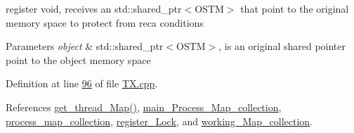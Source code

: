 register void, receives an std\+::shared\+\_\+ptr$<$\+O\+S\+T\+M$>$ that point to the original memory space to protect from reca conditions 


\begin{DoxyParams}{Parameters}
{\em object} & std\+::shared\+\_\+ptr$<$\+O\+S\+T\+M$>$, is an original shared pointer point to the object memory space \\
\hline
\end{DoxyParams}


Definition at line \hyperlink{_t_x_8cpp_source_l00096}{96} of file \hyperlink{_t_x_8cpp_source}{T\+X.\+cpp}.



References \hyperlink{_t_x_8cpp_source_l00301}{get\+\_\+thread\+\_\+\+Map()}, \hyperlink{_t_x_8h_source_l00105}{main\+\_\+\+Process\+\_\+\+Map\+\_\+collection}, \hyperlink{_t_x_8h_source_l00109}{process\+\_\+map\+\_\+collection}, \hyperlink{_t_x_8h_source_l00117}{register\+\_\+\+Lock}, and \hyperlink{_t_x_8h_source_l00093}{working\+\_\+\+Map\+\_\+collection}.


